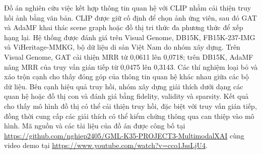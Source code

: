  Đồ án nghiên cứu việc kết hợp thông tin quan hệ với CLIP nhằm cải thiện truy hồi ảnh bằng văn bản. CLIP được giữ cố định để chọn ảnh ứng viên, sau đó GAT và AdaMF khai thác scene graph hoặc đồ thị tri thức đa phương thức để xếp hạng lại. Hệ thống được đánh giá trên Visual Genome, DB15K, FB15K-237-IMG và ViHeritage-MMKG, bộ dữ liệu di sản Việt Nam do nhóm xây dựng. Trên Visual Genome, GAT cải thiện MRR từ 0,0611 lên 0,0718; trên DB15K, AdaMF nâng MRR của truy vấn gián tiếp từ 0,0475 lên 0,3143. Các thí nghiệm loại bỏ và xáo trộn cạnh cho thấy đóng góp của thông tin quan hệ khác nhau giữa các bộ dữ liệu. Bên cạnh hiệu quả truy hồi, nhóm xây dựng giải thích dưới dạng các quan hệ hoặc đồ thị con và đánh giá bằng fidelity, validity và sparsity. Kết quả cho thấy mô hình đồ thị có thể cải thiện truy hồi, đặc biệt với truy vấn gián tiếp, đồng thời cung cấp các giải thích có thể kiểm chứng thông qua can thiệp vào mô hình. Mã nguồn và các tài liệu của đồ án được công bố tại \url{https://github.com/nghiep2405/GML-K35-PROJECT3-MultimodalXAI} cùng video demo tại \url{https://www.youtube.com/watch?v=cco1JssLjU4}.\par
\vspace{0.4em}
